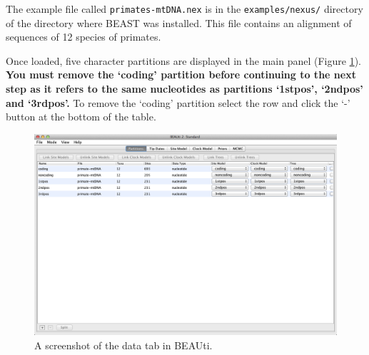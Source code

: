 \documentclass[11pt]{article}
\theoremstyle{plain}%
\theoremstyle{definition}
\theoremstyle{remark}
\begin{document}
The example file called \texttt{primates-mtDNA.nex} is in the {\tt examples/nexus/} directory of the directory where BEAST was installed.
This file contains an alignment of sequences of 12 species of primates. 
%
%
%

Once loaded, five character partitions are displayed in the main panel (Figure \ref{fig:BEAUTI_DataPartitions}). {\bf You must remove the `coding' partition before continuing to the next step as it refers to the same nucleotides as partitions `1stpos', `2ndpos' and `3rdpos'.} To remove the `coding' partition select the row and click the `-' button at the bottom of the table. 

\begin{figure}

\includegraphics[width=\textwidth]{figures/BEAUti_DataPartitions}
\caption{A screenshot of the data tab in BEAUti.}
\label{fig:BEAUTI_DataPartitions}
\end{figure}
\end{document}
